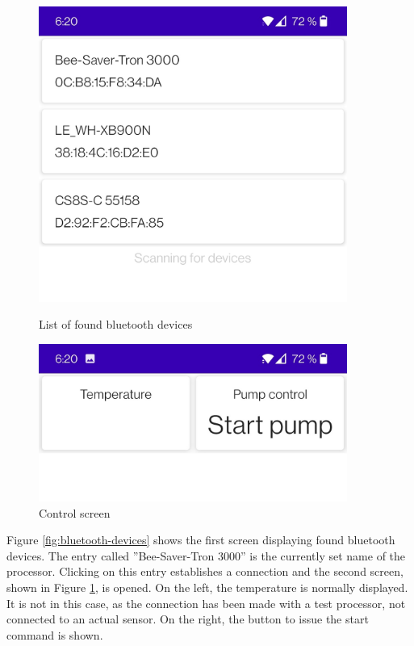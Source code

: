 \begin{figure}[h]
    \centering
    \begin{minipage}{0.5\textwidth}
        \centering
        \includegraphics[width=0.9\textwidth]{img/bluetooth-list}
        \caption{List of found bluetooth devices}
        \label{fig:bluetooth-devices}
    \end{minipage}\hfill
    \begin{minipage}{0.5\textwidth}
        \centering
        \includegraphics[width=0.9\textwidth]{img/control}
        \caption{Control screen}
        \label{fig:control-screen}
    \end{minipage}
\end{figure}

Figure \ref{fig:bluetooth-devices} shows the first screen displaying found bluetooth devices.
The entry called ''Bee-Saver-Tron 3000'' is the currently set name of the processor.
Clicking on this entry establishes a connection and the second screen, shown in Figure \ref{fig:control-screen}, is opened.
On the left, the temperature is normally displayed.
It is not in this case, as the connection has been made with a test processor, not connected to an actual sensor.
On the right, the button to issue the start command is shown.

